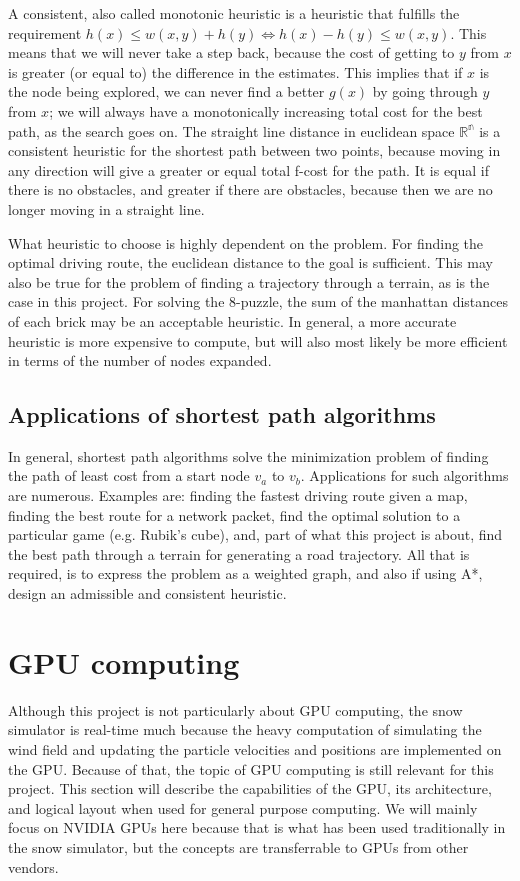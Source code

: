 A consistent, also called monotonic heuristic is a heuristic that fulfills the requirement $h(x) \leq w(x,y) + h(y) \Leftrightarrow h(x)-h(y) \leq w(x,y)$. This means that we will never take a step back, because the cost of getting to $y$ from $x$ is greater (or equal to) the difference in the estimates. This implies that if $x$ is the node being explored, we can never find a better $g(x)$ by going through $y$ from $x$; we will always have a monotonically increasing total cost for the best path, as the search goes on. The straight line distance in euclidean space $\mathbb{R^n}$ is a consistent heuristic for the shortest path between two points, because moving in any direction will give a greater or equal total f-cost for the path. It is equal if there is no obstacles, and greater if there are obstacles, because then we are no longer moving in a straight line.

What heuristic to choose is highly dependent on the problem. For finding the optimal driving route, the euclidean distance to the goal is sufficient. This may also be true for the problem of finding a trajectory through a terrain, as is the case in this project. For solving the 8-puzzle, the sum of the manhattan distances of each brick may be an acceptable heuristic. In general, a more accurate heuristic is more expensive to compute, but will also most likely be more efficient in terms of the number of nodes expanded.

\subsection{Applications of shortest path algorithms}
In general, shortest path algorithms solve the minimization problem of finding the path of least cost from a start node $v_a$ to $v_b$. Applications for such algorithms are numerous. Examples are: finding the fastest driving route given a map, finding the best route for a network packet, find the optimal solution to a particular game (e.g. Rubik's cube), and, part of what this project is about, find the best path through a terrain for generating a road trajectory. All that is required, is to express the problem as a weighted graph, and also if using A*, design an admissible and consistent heuristic. 

\section{GPU computing}
Although this project is not particularly about GPU computing, the snow simulator is real-time much because the heavy computation of simulating the wind field and updating the particle velocities and positions are implemented on the GPU. Because of that, the topic of GPU computing is still relevant for this project. This section will describe the capabilities of the GPU, its architecture, and logical layout when used for general purpose computing. We will mainly focus on NVIDIA GPUs here because that is what has been used traditionally in the snow simulator, but the concepts are transferrable to GPUs from other vendors.

